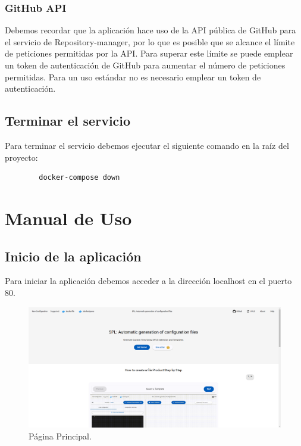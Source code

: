 \documentclass[12pt, a4paper, twoside]{article}
\begin{document}
\begin{umaappendices}
	\subsubsection{GitHub API}
	Debemos recordar que la aplicación hace uso de la API pública de GitHub \cite{github_rest_api} para el servicio de Repository-manager, por lo que es posible que se alcance el límite de peticiones permitidas por la API.
	Para superar este límite se puede emplear un token de autenticación de GitHub \cite{github_tokens} para aumentar el número de peticiones permitidas.
	Para un uso estándar no es necesario emplear un token de autenticación.
	\subsection{Terminar el servicio}
	Para terminar el servicio debemos ejecutar el siguiente comando en la raíz del proyecto:
	\begin{verbatim}
		docker-compose down
	\end{verbatim}



    \section{Manual de Uso}
	\label{sec:Manual de Uso}
	\subsection{Inicio de la aplicación}
	Para iniciar la aplicación debemos acceder a la dirección localhost en el puerto 80.
	\begin{figure}[ht]
		\centering
			\includegraphics[width=1\textwidth]{frontpage.png}
		\caption{Página Principal.}
	\end{figure}

\end{umaappendices}
\end{document}
